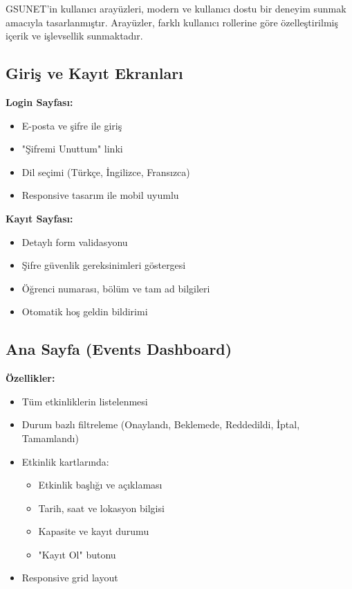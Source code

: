 \documentclass[a4paper,12pt]{report}
\begin{document}
GSUNET'in kullanıcı arayüzleri, modern ve kullanıcı dostu bir deneyim sunmak amacıyla tasarlanmıştır. Arayüzler, farklı kullanıcı rollerine göre özelleştirilmiş içerik ve işlevsellik sunmaktadır.

\subsection{Giriş ve Kayıt Ekranları}

\textbf{Login Sayfası:}
\begin{itemize}
    \item E-posta ve şifre ile giriş
    \item "Şifremi Unuttum" linki
    \item Dil seçimi (Türkçe, İngilizce, Fransızca)
    \item Responsive tasarım ile mobil uyumlu
\end{itemize}

\textbf{Kayıt Sayfası:}
\begin{itemize}
    \item Detaylı form validasyonu
    \item Şifre güvenlik gereksinimleri göstergesi
    \item Öğrenci numarası, bölüm ve tam ad bilgileri
    \item Otomatik hoş geldin bildirimi
\end{itemize}

\subsection{Ana Sayfa (Events Dashboard)}

\textbf{Özellikler:}
\begin{itemize}
    \item Tüm etkinliklerin listelenmesi
    \item Durum bazlı filtreleme (Onaylandı, Beklemede, Reddedildi, İptal, Tamamlandı)
    \item Etkinlik kartlarında:
    \begin{itemize}
        \item Etkinlik başlığı ve açıklaması
        \item Tarih, saat ve lokasyon bilgisi
        \item Kapasite ve kayıt durumu
        \item "Kayıt Ol" butonu
    \end{itemize}
    \item Responsive grid layout
\end{itemize}
\end{document}
